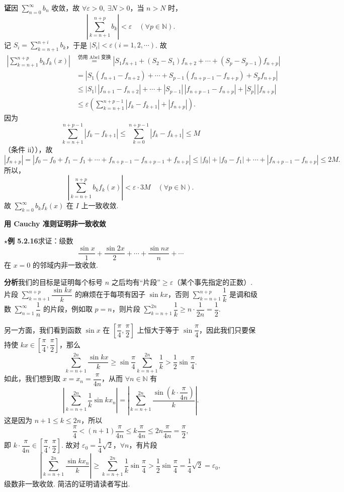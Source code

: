 \documentclass[UTF8,12pt,a4paper,fontset=fandol]{ctexart}
\begin{document}
\noindent\textbf{证}\quad 因 $\displaystyle\sum_{n=0}^{\infty}b_n$ 收敛，故
$\forall\varepsilon>0,\ \exists N>0$，当 $n>N$ 时，
\[
  \left|\sum_{k=n+1}^{n+p}b_k\right|<\varepsilon\quad(\forall p\in\mathbb N).
\]
记 $S_i=\displaystyle\sum_{k=n+1}^{n+i}b_k$，于是
$|S_i|<\varepsilon(i=1,2,\cdots)$. 故
\[
\begin{aligned}
\left|\sum_{k=n+1}^{n+p}b_kf_k(x)\right|
&\stackrel{\text{仿用 Abel 变换}}{=}
\left|S_1f_{n+1}+(S_2-S_1)f_{n+2}+\cdots+(S_p-S_{p-1})f_{n+p}\right|\\
&=\left|S_1(f_{n+1}-f_{n+2})+\cdots+S_{p-1}(f_{n+p-1}-f_{n+p})+S_pf_{n+p}\right|\\
&\le |S_1|\,|f_{n+1}-f_{n+2}|+\cdots+|S_{p-1}|\,|f_{n+p-1}-f_{n+p}|+|S_p|\,|f_{n+p}|\\
&\le\varepsilon\left(\sum_{k=n+1}^{n+p-1}|f_k-f_{k+1}|+|f_{n+p}|\right).
\end{aligned}
\]
因为
\[
  \sum_{k=n+1}^{n+p-1}|f_k-f_{k+1}|
  \le\sum_{k=0}^{n+p-1}|f_k-f_{k+1}|\le M
\]
（条件 ii）），故
\[
  |f_{n+p}|=|f_0-f_0+f_1-f_1+\cdots+f_{n+p-1}-f_{n+p-1}+f_{n+p}|
  \le |f_0|+|f_0-f_1|+\cdots+|f_{n+p-1}-f_{n+p}|\le2M.
\]
所以，
\[
  \left|\sum_{k=n+1}^{n+p}b_kf_k(x)\right|<\varepsilon\cdot3M\quad(\forall p\in\mathbb N).
\]
故 $\displaystyle\sum_{k=0}^{\infty}b_kf_k(x)$ 在 $I$ 上一致收敛.

\noindent\textbf{用 Cauchy 准则证明非一致收敛}

\noindent\textbf{$\star$例 5.2.16}\quad 求证：级数
\[
  \frac{\sin x}{1}+\frac{\sin2x}{2}+\cdots+\frac{\sin nx}{n}+\cdots
\]
在 $x=0$ 的邻域内非一致收敛.

\noindent\textbf{分析}\quad 我们的目标是证明每个标号 $n$ 之后均有“片段”$\ge\varepsilon$（某个事先指定的正数）. 片段
$\displaystyle\sum_{k=n+1}^{n+p}\dfrac{\sin kx}{k}$ 的麻烦在于每项有因子 $\sin kx$，否则
$\displaystyle\sum_{k=n+1}^{n+p}\dfrac1k$ 是调和级数 $\displaystyle\sum_{n=1}^{\infty}\dfrac1n$ 的片段，例如取
$p=n$，则片段 $\displaystyle\sum_{k=n+1}^{2n}\dfrac1k\ge n\cdot\dfrac1{2n}=\dfrac12$.

另一方面，我们看到函数 $\sin x$ 在 $\left[\dfrac{\pi}{4},\dfrac{\pi}{2}\right]$ 上恒大于等于
$\sin\dfrac{\pi}{4}$，因此我们只要保持使
$kx\in\left[\dfrac{\pi}{4},\dfrac{\pi}{2}\right]$，那么
\[
  \sum_{k=n+1}^{2n}\frac{\sin kx}{k}
  \ge \sin\frac{\pi}{4}\sum_{k=n+1}^{2n}\frac1k
  >\frac12\sin\frac{\pi}{4}.
\]
如此，我们想到取 $x=x_n=\dfrac{\pi}{4n}$，从而 $\forall n\in\mathbb N$ 有
\[
  \left|\sum_{k=n+1}^{2n}\frac1k\sin kx_n\right|
  =\left|\sum_{k=n+1}^{2n}\frac{\sin\left(k\cdot\dfrac{\pi}{4n}\right)}{k}\right|.
\]
这是因为 $n+1\le k\le2n$，所以
\[
  \frac{\pi}{4}<(n+1)\frac{\pi}{4n}\le k\frac{\pi}{4n}\le2n\frac{\pi}{4n}=\frac{\pi}{2},
\]
即 $k\cdot\dfrac{\pi}{4n}\in\left[\dfrac{\pi}{4},\dfrac{\pi}{2}\right]$. 故对
$\varepsilon_0=\dfrac14\sqrt2$，$\forall n$，有片段
\[
  \left|\sum_{k=n+1}^{2n}\frac{\sin kx_n}{k}\right|
  \ge \sum_{k=n+1}^{2n}\frac1k\sin\frac{\pi}{4}
  >\frac12\sin\frac{\pi}{4}=\frac14\sqrt2=\varepsilon_0,
\]
级数非一致收敛. 简洁的证明请读者写出.
\end{document}
